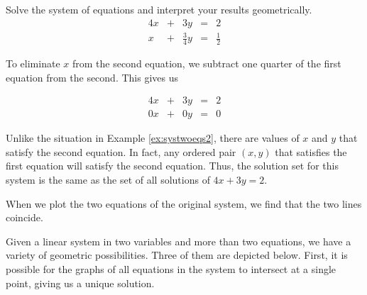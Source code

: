 \documentclass{ximera}
\begin{document}
\begin{example} Solve the system of equations and interpret your results geometrically.
$$\begin{array}{ccccc}
      4x & +&3y&= &2 \\
	 x& +&\frac{3}{4}y&=&\frac{1}{2}
    \end{array}$$

\begin{explanation}
To eliminate $x$ from the second equation, we subtract one quarter of the first equation from the second.  This gives us

$$\begin{array}{ccccc}
      4x & +&3y&= &2 \\
	 0x& +&0y&=&0
    \end{array}$$
    
Unlike the situation in Example \ref{ex:systwoeqs2}, there are values of $x$ and $y$ that satisfy the second equation.  In fact, any ordered pair $(x, y)$ that satisfies the first equation will satisfy the second equation.  Thus, the solution set for this system is the same as the set of all solutions of $4x+3y=2$.  

When we plot the two equations of the original system, we find that the two lines coincide.


    \begin{image}[2.5in]
\end{image}
\end{explanation}
\end{example}

Given a linear system in two variables and more than two equations, we have a variety of geometric possibilities.  Three of them are depicted below.  First, it is possible for the graphs of all equations in the system to intersect at a single point, giving us a unique solution.  

\begin{image}[1.5in]
\end{image}
\end{document}
